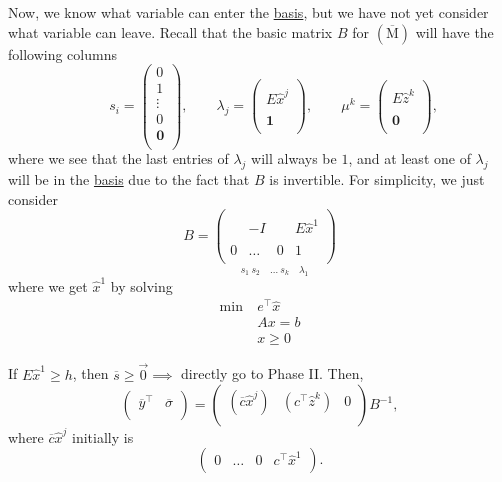 Now, we know what variable can enter the \hyperref[def:basis]{basis}, but we have not yet consider what variable can leave. Recall that the basic matrix \(B\) for \((\overline{\mathrm{M}})\) will have the following columns
\[
	\qquad s_{i} = \begin{pmatrix}
		0      \\
		1      \\
		\vdots \\
		0      \\
		\bm{0} \\
	\end{pmatrix}, \qquad \lambda_{j} = \begin{pmatrix}
		\\
		E \hat{x}^j \\
		\\
		\bm{1}      \\
	\end{pmatrix}, \qquad \mu^k =\begin{pmatrix}
		\\
		E \hat{z}^k \\
		\\
		\bm{0}      \\
	\end{pmatrix},
\]
where we see that the last entries of \(\lambda_{j}\) will always be \(1\), and at least one of \(\lambda_{j}\) will be in the \hyperref[def:basis]{basis} due to the fact that \(B\) is invertible. For simplicity, we just consider
\[
	B = \underset{s_1\ s_2\quad \dots\ s_k\quad \lambda_1}{
		\begin{pmatrix}
			  &       &   &             \\
			  & -I    &   & E \hat{x}^1 \\
			  &       &   &             \\
			0 & \dots & 0 & 1           \\
		\end{pmatrix}}
\]
where we get \(\hat{x}^1\) by solving
\[
	\begin{aligned}
		\min~ & e^{\top}\hat{x} \\
		      & Ax = b          \\
		      & x\geq 0
	\end{aligned}
\]

If \(E \hat{x}^1\geq h\), then \(\overline{s}\geq \vec{0}\implies\) directly go to Phase II. Then,
\[
	\begin{pmatrix}
		\overline{y}^{\top} & \overline{\sigma} \\
	\end{pmatrix} = \begin{pmatrix}
		(\overline{c}\hat{x}^j) & (c^{\top}\hat{z}^k) & 0 \\
	\end{pmatrix}B^{-1},
\]
where \(\overline{c}\hat{x}^j\) initially is
\[
	\begin{pmatrix}
		0 & \dots & 0 & c^{\top}\hat{x}^1 \\
	\end{pmatrix}.
\]

